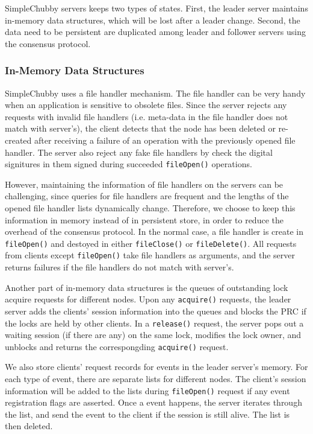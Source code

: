 SimpleChubby servers keeps two types of states. First, the
leader server maintains in-memory data structures, which will be lost
after a leader change. Second, the data need to be persistent are duplicated
among leader and follower servers using the consensus protocol.


\subsubsection{In-Memory Data Structures}

SimpleChubby uses a file handler mechanism. The file handler can be very
handy when an application is sensitive to obsolete files. Since the server
rejects any requests with invalid file handlers (i.e. meta-data in the file
handler does not match with server's), the client detects that the node has
been deleted or re-created after receiving a failure of an operation with
the previously opened file handler. The server also reject any fake file
handlers by check the digital signitures in them signed during succeeded
\texttt{fileOpen()} operations.

However, maintaining the information of file handlers on the servers can
be challenging, since queries for file handlers are frequent and the lengths
of the opened file handler lists dynamically change. Therefore, we choose
to keep this information in memory instead of in persistent store, in order
to reduce the overhead of the consensus protocol. In the normal case, a file
handler is create in \texttt{fileOpen()} and destoyed in either
\texttt{fileClose()} or \texttt{fileDelete()}.
All requests from clients except \texttt{fileOpen()} take file handlers as
arguments,
and the server returns failures if the file handlers do not match with
server's.

Another part of in-memory data structures is the queues of outstanding lock
acquire requests for different nodes. Upon any \texttt{acquire()} requests, the
leader server adds the clients' session information into the queues and
blocks the PRC if the locks are held by other clients.
In a \texttt{release()} request, the server pops out a waiting session
(if there are any) on the same lock, modifies the lock owner, and unblocks and
returns the correspongding \texttt{acquire()} request.

We also store clients' request records for events in the leader server's memory.
For each type of event, there are separate lists for different nodes.
The client's session information will be added to the lists during
\texttt{fileOpen()}
request if any event registration flags are asserted. Once a event happens,
the server iterates through the list, and send the event to the client if the
session is still alive. The list is then deleted.



